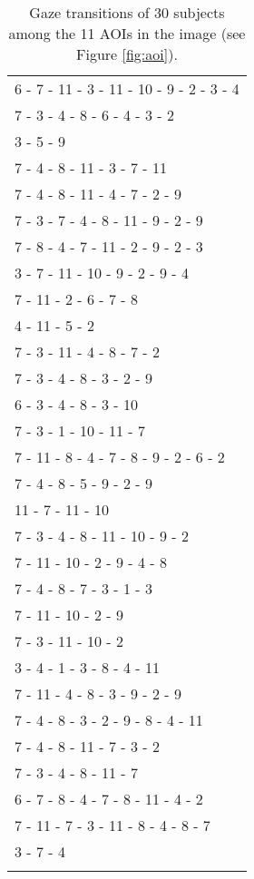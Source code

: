 \begin{table}[H]
  \small
  \begin{tabular}{l}
    6 - 7 - 11 - 3 - 11 - 10 - 9 - 2 - 3 - 4\\
    7 - 3 - 4 - 8 - 6 - 4 - 3 - 2\\
    3 - 5 - 9\\
    7 - 4 - 8 - 11 - 3 - 7 - 11\\
    7 - 4 - 8 - 11 - 4 - 7 - 2 - 9\\
    7 - 3 - 7 - 4 - 8 - 11 - 9 - 2 - 9\\
    7 - 8 - 4 - 7 - 11 - 2 - 9 - 2 - 3\\
    3 - 7 - 11 - 10 - 9 - 2 - 9 - 4\\
    7 - 11 - 2 - 6 - 7 - 8\\
    4 - 11 - 5 - 2\\
    7 - 3 - 11 - 4 - 8 - 7 - 2\\
    7 - 3 - 4 - 8 - 3 - 2 - 9\\
    6 - 3 - 4 - 8 - 3 - 10\\
    7 - 3 - 1 - 10 - 11 - 7\\
    7 - 11 - 8 - 4 - 7 - 8 - 9 - 2 - 6 - 2\\
    7 - 4 - 8 - 5 - 9 - 2 - 9\\
    11 - 7 - 11 - 10\\
    7 - 3 - 4 - 8 - 11 - 10 - 9 - 2\\
    7 - 11 - 10 - 2 - 9 - 4 - 8\\
    7 - 4 - 8 - 7 - 3 - 1 - 3\\
    7 - 11 - 10 - 2 - 9\\
    7 - 3 - 11 - 10 - 2\\
    3 - 4 - 1 - 3 - 8 - 4 - 11\\
    7 - 11 - 4 - 8 - 3 - 9 - 2 - 9\\
    7 - 4 - 8 - 3 - 2 - 9 - 8 - 4 - 11\\
    7 - 4 - 8 - 11 - 7 - 3 - 2 \\
    7 - 3 - 4 - 8 - 11 - 7\\
    6 - 7 - 8 - 4 - 7 - 8 - 11 - 4 - 2\\
    7 - 11 - 7 - 3 - 11 - 8 - 4 - 8 - 7\\
    3 - 7 - 4\\
    \\
  \end{tabular}
  \caption{Gaze transitions of 30 subjects among the 11 AOIs in the image (see Figure \ref{fig:aoi}).}
  \label{tab:seq}
\end{table}

